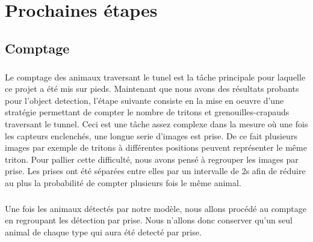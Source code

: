 \chapter{Prochaines étapes}
\section{Comptage}
\paragraph{} Le comptage des animaux traversant le tunel est la tâche principale pour laquelle ce projet a été mis sur pieds. Maintenant que nous avons des résultats probants pour l'object detection, l'étape suivante consiste en la mise en oeuvre d'une stratégie permettant de compter le nombre de tritons et grenouilles-crapauds traversant le tunnel. Ceci est une tâche assez complexe dans la mesure où une fois les capteurs enclenchés, une longue serie d'images est prise. De ce fait plusieurs images par exemple de tritons à différentes positions peuvent représenter le même triton. Pour pallier cette difficulté, nous avons pensé à regrouper les images par prise. Les prises ont été séparées entre elles par un intervalle de 2s afin de réduire au plus la probabilité de compter plusieurs fois le même animal. 

\paragraph{} Une fois les animaux détectés par notre modèle, nous allons procédé au comptage en regroupant les détection par prise. Nous n'allons donc conserver qu'un seul animal de chaque type qui aura été detecté par prise. 



